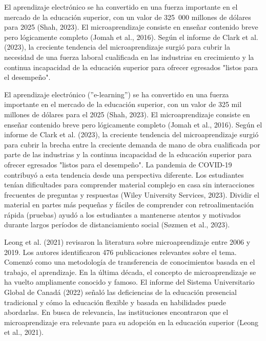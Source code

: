 
El aprendizaje electrónico se ha convertido en una fuerza importante en el
mercado de la educación superior, con un valor de 325 000 millones de dólares
para 2025 (Shah, 2023). El microaprendizaje consiste en enseñar contenido breve
pero lógicamente completo (Jomah et al., 2016). Según el informe de Clark et al.
(2023), la creciente tendencia del microaprendizaje surgió para cubrir la
necesidad de una fuerza laboral cualificada en las industrias en crecimiento y
la continua incapacidad de la educación superior para ofrecer egresados
​​"listos para el desempeño".

El aprendizaje electrónico (''e-learning'') se ha convertido en una fuerza importante en el
mercado de la educación superior, con un valor de 325 mil millones de dólares
para el 2025 (Shah, 2023). El microaprendizaje consiste en enseñar contenido breve
pero lógicamente completo (Jomah et al., 2016). Según el informe de Clark et al.
(2023), la creciente tendencia del microaprendizaje surgió para cubrir la brecha
entre la creciente demanda de mano de obra cualificada por parte de las
industrias y la continua incapacidad de la educación superior para ofrecer
egresados "listos para el desempeño". La pandemia de COVID-19 contribuyó a
esta tendencia desde una perspectiva diferente. Los estudiantes tenían
dificultades para comprender material complejo en casa sin interacciones
frecuentes de preguntas y respuestas (Wiley University Services, 2023). Dividir
el material en partes más pequeñas y fáciles de comprender con retroalimentación
rápida (pruebas) ayudó a los estudiantes a mantenerse atentos y motivados
durante largos períodos de distanciamiento social (Søzmen et al., 2023).

Leong et al. (2021) revisaron la literatura sobre microaprendizaje entre 2006 y
2019. Los autores identificaron 476 publicaciones relevantes sobre el tema.
Comenzó como una metodología de transferencia de conocimientos basada en el
trabajo, el aprendizaje. En la última década, el concepto de microaprendizaje se
ha vuelto ampliamente conocido y famoso. El informe del Sistema Universitario
Global de Canadá (2022) señaló las deficiencias de la educación presencial
tradicional y cómo la educación flexible y basada en habilidades puede
abordarlas. En busca de relevancia, las instituciones encontraron que el
microaprendizaje era relevante para su adopción en la educación superior (Leong
et al., 2021).

